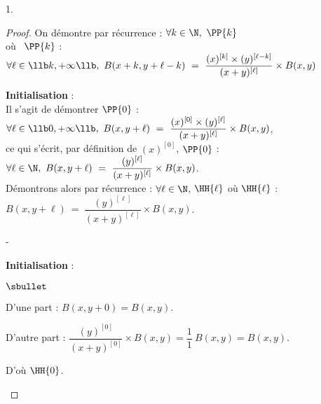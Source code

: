 \documentclass[11pt]{article}%
\begin{document}
\begin{noliste}{1.}
\begin{proof}
    
    \noindent
    On démontre par récurrence : $\forall k \in \N, \ \PP{k}$
    \\
    où \ $\PP{k}$ : $\forall \ell \in \llb k, +\infty \llb, \ B(x+k,
    y+\ell-k) \ = \ \dfrac{(x)^{[k]} \times (y)^{[\ell-k]}}{(x +
      y)^{[\ell]}} \times B(x,y)$
    \begin{noliste}{\fitem}
    \item {\bf Initialisation} :\\
      Il s'agit de démontrer $\PP{0}$ : $\forall \ell \in \llb 0,
      +\infty \llb, \ B(x, y+\ell) \ = \ \dfrac{(x)^{[0]} \times
        (y)^{[\ell]}}{(x + y)^{[\ell]}} \times B(x,y)$,\\
      ce qui s'écrit, par définition de $(x)^{[0]}$, $\PP{0}$ :
      $\forall \ell \in \N, \ B(x, y+\ell) \ = \
      \dfrac{(y)^{[\ell]}}{(x + y)^{[\ell]}} \times B(x,y)$.\\[.4cm]
      Démontrons alors par récurrence : $\forall \ell \in \N$,
      $\HH{\ell}$ \quad où \quad $\HH{\ell}$ : $B(x, y+\ell) \ = \
      \dfrac{(y)^{[\ell]}}{(x + y)^{[\ell]}} \times B(x,y)$.
      
      \begin{noliste}{-}
      \item {\bf Initialisation} :
        \begin{noliste}{$\sbullet$}
        \item D'une part : $B(x, y + 0) = B(x, y)$.
        \item D'autre part : $\dfrac{(y)^{[0]}}{(x + y)^{[0]}}
          \times B(x,y) = \dfrac{1}{1} \ B(x, y) = B(x, y)$.            
        \end{noliste}
        D'où $\HH{0}$.
        

\end{noliste}
\end{noliste}
\end{proof}
\end{noliste}
\end{document}
